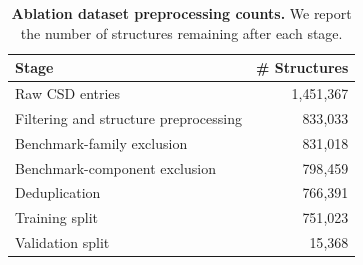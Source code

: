 \begin{table}[H]
\centering
\caption{\textbf{Ablation dataset preprocessing counts.}
We report the number of structures remaining after each
stage.}
\label{tab:dataset-preprocessing-counts}
\begin{tabular}{@{}lr@{}}
\toprule
Stage & \# Structures \\
\midrule
Raw CSD entries & 1{,}451{,}367 \\
Filtering and structure preprocessing & 833{,}033 \\
Benchmark-family exclusion & 831{,}018 \\
Benchmark-component exclusion & 798{,}459 \\
Deduplication & 766{,}391 \\
\midrule
Training split & 751{,}023 \\
Validation split & 15{,}368 \\
\bottomrule
\end{tabular}
\end{table}
